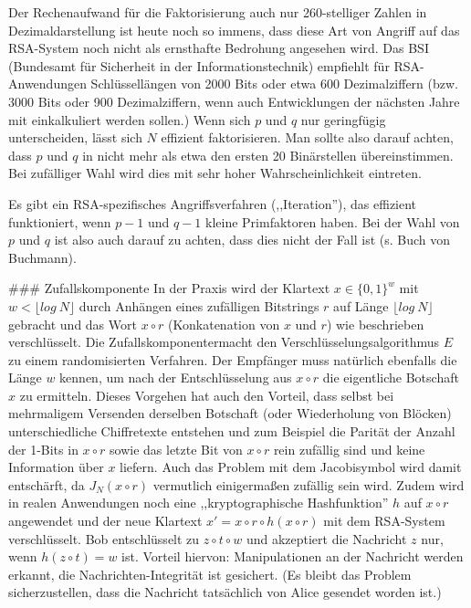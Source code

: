 \documentclass[a4paper]{article}
\begin{document}
\begin{multicols}{3}
{{{{        Der Rechenaufwand für die Faktorisierung auch nur 260-stelliger Zahlen in Dezimaldarstellung ist heute noch so immens, dass diese Art von Angriff auf das RSA-System noch nicht als ernsthafte Bedrohung angesehen wird. Das BSI (Bundesamt für Sicherheit in der Informationstechnik) empfiehlt für RSA-Anwendungen Schlüssellängen von 2000 Bits oder etwa 600 Dezimalziffern (bzw. 3000 Bits oder 900 Dezimalziffern, wenn auch Entwicklungen der nächsten Jahre mit einkalkuliert werden sollen.)
        Wenn sich $p$ und $q$ nur geringfügig unterscheiden, lässt sich $N$ effizient faktorisieren. Man sollte also darauf achten, dass $p$ und $q$ in nicht mehr als etwa den ersten 20 Binärstellen übereinstimmen. Bei zufälliger Wahl wird dies mit sehr hoher Wahrscheinlichkeit eintreten.

        Es gibt ein RSA-spezifisches Angriffsverfahren (,,Iteration''), das effizient funktioniert, wenn $p-1$ und $q-1$ kleine Primfaktoren haben. Bei der Wahl von $p$ und $q$ ist also auch darauf zu achten, dass dies nicht der Fall ist (s. Buch von Buchmann).

        ### Zufallskomponente
        In der Praxis wird der Klartext $x\in\{0,1\}^w$ mit $w<\lfloor log\ N\rfloor$ durch Anhängen eines zufälligen Bitstrings $r$ auf Länge $\lfloor log\ N\rfloor$ gebracht und das Wort $x\circ r$ (Konkatenation von $x$ und $r$) wie beschrieben verschlüsselt. Die Zufallskomponentermacht den Verschlüsselungsalgorithmus $E$ zu einem randomisierten Verfahren. Der Empfänger muss natürlich ebenfalls die Länge $w$ kennen, um nach der Entschlüsselung aus $x\circ r$ die eigentliche Botschaft $x$ zu ermitteln. Dieses Vorgehen hat auch den Vorteil, dass selbst bei mehrmaligem Versenden derselben Botschaft (oder Wiederholung von Blöcken) unterschiedliche Chiffretexte entstehen und zum Beispiel die Parität der Anzahl der 1-Bits in $x\circ r$ sowie das letzte Bit von $x\circ r$ rein zufällig sind und keine Information über $x$ liefern. Auch das Problem mit dem Jacobisymbol wird damit entschärft, da $J_N(x\circ r)$ vermutlich einigermaßen zufällig sein wird. Zudem wird in realen Anwendungen noch eine ,,kryptographische Hashfunktion'' $h$ auf $x\circ r$ angewendet und der neue Klartext $x′=x\circ r\circ h(x\circ r)$ mit dem RSA-System verschlüsselt. Bob entschlüsselt zu $z\circ t\circ w$ und akzeptiert die Nachricht $z$ nur, wenn $h(z\circ t)=w$ ist. Vorteil hiervon: Manipulationen an der Nachricht werden erkannt, die Nachrichten-Integrität
        ist gesichert. (Es bleibt das Problem sicherzustellen, dass die Nachricht tatsächlich von Alice gesendet worden ist.)

}}}}
\end{multicols}
\end{document}

